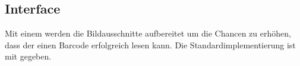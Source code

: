 \subsection{Interface }
Mit einem  werden die Bildausschnitte aufbereitet um die Chancen zu erhöhen, dass der  einen Barcode erfolgreich lesen kann.
Die Standardimplementierung ist mit  gegeben.

